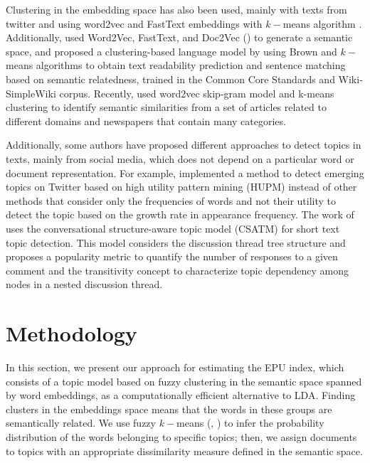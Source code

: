 \documentclass{article}
\begin{document}
Clustering in the embedding space has also been used, mainly with texts from twitter and using word2vec and FastText \citep{fasttext_bojanowski-etal-2017} embeddings with $k-$means algorithm \citep{Vargas2019a, Vargas2019b, Vargas2019c}. Additionally,  \cite{Chan2017} used  Word2Vec, FastText, and Doc2Vec (\cite{doc2vec}) to generate a semantic space, and proposed a clustering-based language model by using Brown \citep{brown-etal-1992-class} and $k-$means algorithms to obtain text readability prediction and sentence matching based on semantic relatedness, trained in the Common Core Standards and Wiki-SimpleWiki corpus. Recently, \cite{Meghana2020} used word2vec skip-gram model and k-means clustering to identify semantic similarities from a set of articles related to different domains and newspapers that contain many categories. 

Additionally, some authors have proposed different approaches to detect topics in texts, mainly from social media, which does not depend on a particular word or document representation. For example, \cite{Choi2019} implemented a  method to detect emerging topics on Twitter based on high utility pattern mining (HUPM) instead of other methods that consider only the frequencies of words and not their utility  to detect the topic based on the growth rate in appearance frequency. The work of \cite{Sun2020} uses the conversational structure-aware topic model (CSATM) for short text topic detection. This model considers the discussion thread tree structure and proposes a popularity metric to quantify the number of responses to a given comment and the transitivity concept to characterize topic dependency among nodes in a nested discussion thread. 

\section{Methodology}
\label{sec:methodology}

In this section, we present our approach for estimating the EPU index, which consists of a topic model based on fuzzy clustering in the semantic space spanned by word embeddings, as a computationally efficient alternative to LDA. Finding clusters in the embeddings space means that the words in these groups are semantically related. We use fuzzy $k-$means (\cite{dunn73}, \cite{kaufman90}) to infer the probability distribution of the words belonging to specific topics;  then, we assign documents to topics with an appropriate dissimilarity measure defined in the semantic space.
\end{document}
